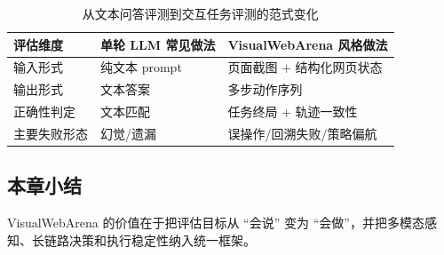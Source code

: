 \begin{table}[H]
\centering
\small
\begin{tabular}{p{2.8cm}p{4.0cm}p{4.2cm}}
\toprule
\textbf{评估维度} & \textbf{单轮 LLM 常见做法} & \textbf{VisualWebArena 风格做法} \\
\midrule
输入形式 & 纯文本 prompt & 页面截图 + 结构化网页状态 \\
输出形式 & 文本答案 & 多步动作序列 \\
正确性判定 & 文本匹配 & 任务终局 + 轨迹一致性 \\
主要失败形态 & 幻觉/遗漏 & 误操作/回溯失败/策略偏航 \\
\bottomrule
\end{tabular}
\caption{从文本问答评测到交互任务评测的范式变化}
\end{table}

\subsection{本章小结}
VisualWebArena 的价值在于把评估目标从 ``会说'' 变为 ``会做''，并把多模态感知、长链路决策和执行稳定性纳入统一框架。

